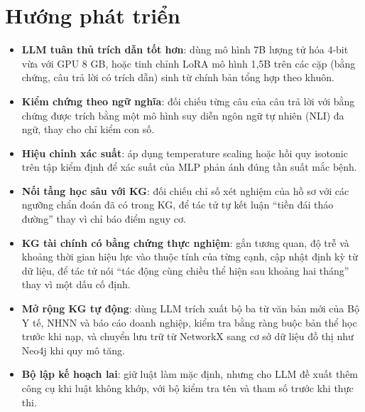 \section{Hướng phát triển}
\begin{itemize}
  \item \textbf{LLM tuân thủ trích dẫn tốt hơn}: dùng mô hình 7B lượng tử hóa 4-bit vừa với GPU 8 GB, hoặc tinh chỉnh
        LoRA mô hình 1,5B trên các cặp (bằng chứng, câu trả lời có trích dẫn) sinh từ chính bản tổng hợp theo khuôn.
  \item \textbf{Kiểm chứng theo ngữ nghĩa}: đối chiếu từng câu của câu trả lời với bằng chứng được trích bằng một mô
        hình suy diễn ngôn ngữ tự nhiên (NLI) đa ngữ, thay cho chỉ kiểm con số.
  \item \textbf{Hiệu chỉnh xác suất}: áp dụng temperature scaling hoặc hồi quy isotonic trên tập kiểm định để xác
        suất của MLP phản ánh đúng tần suất mắc bệnh.
  \item \textbf{Nối tầng học sâu với KG}: đối chiếu chỉ số xét nghiệm của hồ sơ với các ngưỡng chẩn đoán đã có trong
        KG, để tác tử tự kết luận ``tiền đái tháo đường'' thay vì chỉ báo điểm nguy cơ.
  \item \textbf{KG tài chính có bằng chứng thực nghiệm}: gắn tương quan, độ trễ và khoảng thời gian hiệu lực vào thuộc
        tính của từng cạnh, cập nhật định kỳ từ dữ liệu, để tác tử nói ``tác động cùng chiều thể hiện sau khoảng hai
        tháng'' thay vì một dấu cố định.
  \item \textbf{Mở rộng KG tự động}: dùng LLM trích xuất bộ ba từ văn bản mới của Bộ Y tế, NHNN và báo cáo doanh
        nghiệp, kiểm tra bằng ràng buộc bản thể học trước khi nạp, và chuyển lưu trữ từ NetworkX sang cơ sở dữ liệu đồ
        thị như Neo4j khi quy mô tăng.
  \item \textbf{Bộ lập kế hoạch lai}: giữ luật làm mặc định, nhưng cho LLM đề xuất thêm công cụ khi luật không khớp,
        với bộ kiểm tra tên và tham số trước khi thực thi.
\end{itemize}
